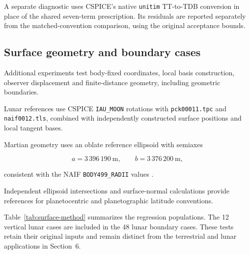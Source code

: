 A separate diagnostic uses CSPICE's native \texttt{unitim} TT-to-TDB conversion in place of the
shared seven-term prescription. Its residuals are reported separately from the matched-convention
comparison, using the original acceptance bounds.

\subsection{Surface geometry and boundary cases}

Additional experiments test body-fixed coordinates, local basis construction, observer displacement
and finite-distance geometry, including geometric boundaries.

Lunar references use CSPICE \texttt{IAU\_MOON} rotations with \texttt{pck00011.tpc} and
\texttt{naif0012.tls}, combined with independently constructed surface positions and local tangent
bases.

Martian geometry uses an oblate reference ellipsoid with semiaxes

\begin{equation}
    a=3\,396\,190\ \mathrm{m},
    \qquad
    b=3\,376\,200\ \mathrm{m},
\end{equation}

consistent with the NAIF \texttt{BODY499\_RADII} values \cite{naifpck00011}.

Independent ellipsoid intersections and surface-normal calculations provide references for
planetocentric and planetographic latitude conventions.

Table~\ref{tab:surface-method} summarizes the regression populations. The 12 vertical lunar cases
are included in the 48 lunar boundary cases. These tests retain their original inputs and remain
distinct from the terrestrial and lunar applications in Section~6.

